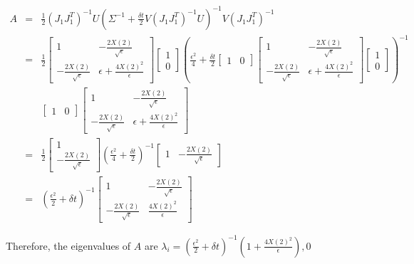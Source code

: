 \documentclass[12pt]{article}
\begin{document}
\begin{eqnarray}
A &=& 
\frac{1}{2} (J_1 J_1^T)^{-1} U \left(\Sigma^{-1} + \frac{\delta t}{2} V \left( J_1 J_1^T \right)^{-1} U \right)^{-1} V \left( J_1 J_1^T \right)^{-1} \\
&=& \frac{1}{2} 
\begin{bmatrix} 1 & -\frac{2X(2)}{\sqrt{\epsilon}} \\ -\frac{2X(2)}{\sqrt{\epsilon}} & \epsilon+\frac{4 X(2)^2}{\epsilon} \end{bmatrix}
\begin{bmatrix} 1 \\ 0 \end{bmatrix}
\left( \frac{\epsilon^2}{4} + 
\frac{\delta t}{2} 
\begin{bmatrix} 1 & 0 \end{bmatrix}
\begin{bmatrix} 1 & -\frac{2X(2)}{\sqrt{\epsilon}} \\ -\frac{2X(2)}{\sqrt{\epsilon}} & \epsilon+\frac{4 X(2)^2}{\epsilon} \end{bmatrix}
\begin{bmatrix} 1 \\ 0 \end{bmatrix}
\right)^{-1} \\
&&\begin{bmatrix} 1 & 0 \end{bmatrix}
\begin{bmatrix} 1 & -\frac{2X(2)}{\sqrt{\epsilon}} \\ -\frac{2X(2)}{\sqrt{\epsilon}} & \epsilon+\frac{4  X(2)^2}{\epsilon} \end{bmatrix} \\
&=& \frac{1}{2} 
\begin{bmatrix} 1 \\ -\frac{2X(2)}{\sqrt{\epsilon}} \end{bmatrix}
\left( \frac{\epsilon^2}{4} + 
\frac{\delta t}{2} 
\right)^{-1} 
\begin{bmatrix} 1 & -\frac{2X(2)}{\sqrt{\epsilon}} \end{bmatrix} \\
&=& \left( \frac{\epsilon^2}{2} + 
\delta t
\right)^{-1} 
\begin{bmatrix}
1 & -\frac{2X(2)}{\sqrt{\epsilon}} \\ -\frac{2X(2)}{\sqrt{\epsilon}} & \frac{4 X(2)^2}{\epsilon}
\end{bmatrix}
\end{eqnarray}

Therefore, the eigenvalues of $A$ are $\lambda_i = \left( \frac{\epsilon^2}{2} +  \delta t \right)^{-1} \left( 1 + \frac{4X(2)^2}{\epsilon} \right), 0$
\end{document}
